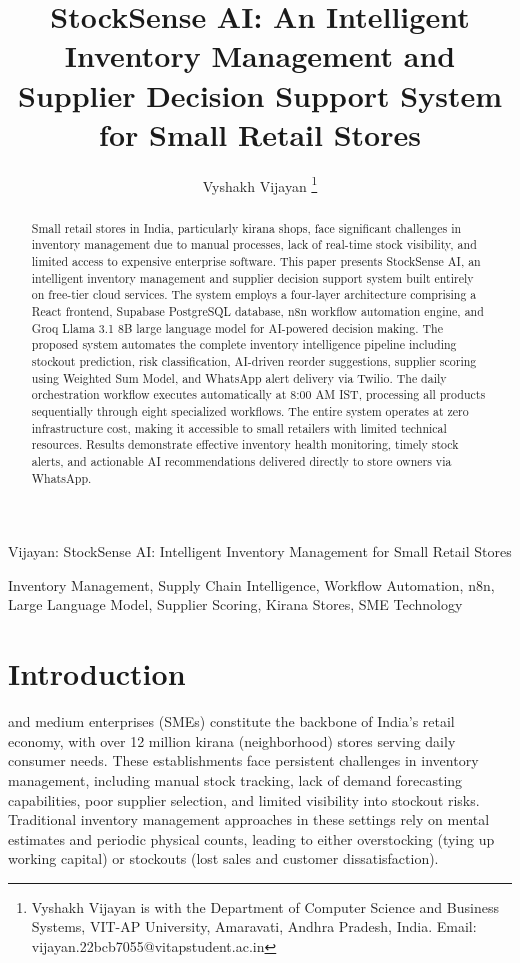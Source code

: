 \documentclass[journal]{IEEEtran}
\begin{document}
\title{StockSense AI: An Intelligent Inventory Management and Supplier Decision Support System for Small Retail Stores}

\author{Vyshakh Vijayan%
\thanks{Vyshakh Vijayan is with the Department of Computer Science and Business Systems, VIT-AP University, Amaravati, Andhra Pradesh, India. Email: vijayan.22bcb7055@vitapstudent.ac.in}%
}

%
{Vijayan: StockSense AI: Intelligent Inventory Management for Small Retail Stores}

\maketitle

\begin{abstract}
Small retail stores in India, particularly kirana shops, face significant challenges in inventory management due to manual processes, lack of real-time stock visibility, and limited access to expensive enterprise software. This paper presents StockSense AI, an intelligent inventory management and supplier decision support system built entirely on free-tier cloud services. The system employs a four-layer architecture comprising a React frontend, Supabase PostgreSQL database, n8n workflow automation engine, and Groq Llama 3.1 8B large language model for AI-powered decision making. The proposed system automates the complete inventory intelligence pipeline including stockout prediction, risk classification, AI-driven reorder suggestions, supplier scoring using Weighted Sum Model, and WhatsApp alert delivery via Twilio. The daily orchestration workflow executes automatically at 8:00 AM IST, processing all products sequentially through eight specialized workflows. The entire system operates at zero infrastructure cost, making it accessible to small retailers with limited technical resources. Results demonstrate effective inventory health monitoring, timely stock alerts, and actionable AI recommendations delivered directly to store owners via WhatsApp.
\end{abstract}

\begin{IEEEkeywords}
Inventory Management, Supply Chain Intelligence, Workflow Automation, n8n, Large Language Model, Supplier Scoring, Kirana Stores, SME Technology
\end{IEEEkeywords}

\section{Introduction}
 and medium enterprises (SMEs) constitute the backbone of India's retail economy, with over 12 million kirana (neighborhood) stores serving daily consumer needs. These establishments face persistent challenges in inventory management, including manual stock tracking, lack of demand forecasting capabilities, poor supplier selection, and limited visibility into stockout risks. Traditional inventory management approaches in these settings rely on mental estimates and periodic physical counts, leading to either overstocking (tying up working capital) or stockouts (lost sales and customer dissatisfaction).
\end{document}
